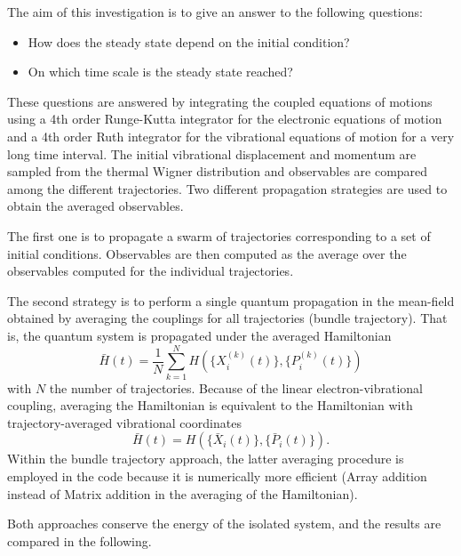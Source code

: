 \documentclass{article}
\begin{document}
The aim of this investigation is to give an answer to the following questions:
\begin{itemize}
	\item[1.] How does the steady state depend on the initial condition? 
	\item[2.] On which time scale is the steady state reached?
\end{itemize}
These questions are answered by integrating the coupled equations of motions using a 4th order Runge-Kutta integrator for the electronic equations of motion and a 4th order Ruth integrator for the vibrational equations of motion for a very long time interval. The initial vibrational displacement and momentum are sampled from the thermal Wigner distribution and observables are compared among the different trajectories. Two different propagation strategies are used to obtain the averaged observables. 

The first one is to propagate a swarm of trajectories corresponding to a set of initial conditions. Observables are then computed as the average over the observables computed for the individual trajectories. 

The second strategy is to perform a single quantum propagation in the mean-field obtained by averaging the couplings for all trajectories (bundle trajectory). That is, the quantum system is propagated under the averaged Hamiltonian
\begin{equation*}
	\bar{H}(t)= \frac{1}{N}\sum_{k=1}^N H(\{X_i^{(k)}(t)\},\{P_i^{(k)}(t)\})
\end{equation*}
with $N$ the number of trajectories. Because of the linear electron-vibrational coupling, averaging the Hamiltonian is equivalent to the Hamiltonian with trajectory-averaged vibrational coordinates
\begin{equation*}
	\bar{H}(t) = H(\{\bar{X}_i(t)\},\{\bar{P}_i(t)\}).
\end{equation*}
Within the bundle trajectory approach, the latter averaging procedure is employed in the code because it is numerically more efficient (Array addition instead of Matrix addition in the averaging of the Hamiltonian). 

Both approaches conserve the energy of the isolated system, and the results are compared in the following.
\end{document}
